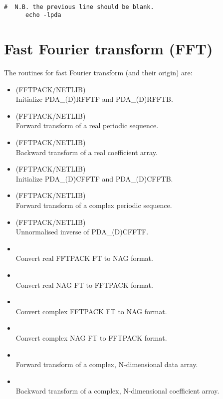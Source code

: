 \begin{verbatim}

#  N.B. the previous line should be blank.
      echo -lpda
\end{verbatim}


\section{Fast Fourier transform (FFT)}

   The routines for fast Fourier transform (and their origin) are:

\begin{itemize}

\item {} (FFTPACK/NETLIB)\ \\
   Initialize PDA\_(D)RFFTF and PDA\_(D)RFFTB.
\item {} (FFTPACK/NETLIB)\ \\
   Forward transform of a real periodic sequence.
\item {} (FFTPACK/NETLIB)\ \\
   Backward transform of a real coefficient array.
\item {} (FFTPACK/NETLIB)\ \\
   Initialize PDA\_(D)CFFTF and PDA\_(D)CFFTB.
\item {} (FFTPACK/NETLIB)\ \\
   Forward transform of a complex periodic sequence.
\item {} (FFTPACK/NETLIB)\ \\
   Unnormalised inverse of PDA\_(D)CFFTF.

\item {}\ \\
   Convert real FFTPACK FT to NAG format.
\item {}\ \\
   Convert real NAG FT to FFTPACK format.
\item {}\ \\
   Convert complex FFTPACK FT to NAG format.
\item {}\ \\
   Convert complex NAG FT to FFTPACK format.

\item {}\ \\
   Forward transform of a complex, N-dimensional data array.
\item {}\ \\
   Backward transform of a complex, N-dimensional coefficient array.

\end{itemize}
